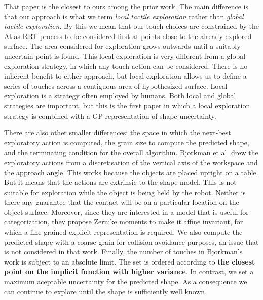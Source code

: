 That paper is the closest to ours among the prior work. The main difference is that our approach is what we term {\em local tactile exploration} rather than {\em global tactile exploration}. By this we mean that our touch choices are constrained by the Atlas-RRT process to be considered first at points close to the already explored surface. The area considered for exploration grows outwards until a suitably uncertain point is found. This local exploration is very different from a global exploration strategy, in which any touch action can be considered. There is no inherent benefit to either approach, but local exploration allows us to define a series of touches across a contiguous area of hypothesized surface. Local exploration is a strategy often employed by humans. Both local and global strategies are important, but this is the first paper in which a local exploration strategy is combined with a GP representation of shape uncertainty. 

There are also other smaller differences: the space in which the next-best exploratory action is computed, the grain size to compute the predicted shape, and the terminating condition for the overall algorithm.
Bjorkman et al.
\cite{Bjorkman2013Enhancing}
drew the exploratory actions from a discretisation of the vertical axis of the workspace and the approach angle. This works because the objects are placed upright on a table. But it means that the actions are extrinsic to the shape model. This is not suitable for exploration while the object is being held by the robot. Neither is there any guarantee that the contact will be on a particular location on the object surface. Moreover, since they are interested in a model that is useful for categorization, they propose Zernike moments to make it affine invariant, for which a fine-grained explicit representation is required. We also compute the predicted shape with a coarse grain for collision avoidance purposes, an issue that is not considered in that work. Finally, the number of touches in Bjorkman's work is subject to an absolute limit. The set is ordered according to {\bf the closest point on the implicit function with higher variance}. In contrast, we set a maximum aceptable uncertainty for the predicted shape. As a consequence we can continue to explore until the shape is sufficiently well known.
